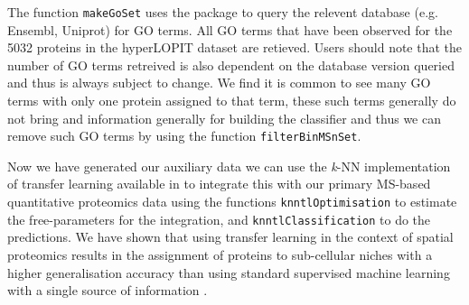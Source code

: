 The function \texttt{makeGoSet} uses the  package to
query the relevent database (e.g. Ensembl, Uniprot) for GO terms. All
GO terms that have been observed for the 5032 proteins in the
hyperLOPIT dataset are retieved. Users should note that the number of
GO terms retreived is also dependent on the database version queried
and thus is always subject to change. We find it is common to see many
GO terms with only one protein assigned to that term, these such terms
generally do not bring and information generally for building the
classifier and thus we can remove such GO terms by using the function
\texttt{filterBinMSnSet}.

\begin{knitrout}
\color{fgcolor}\begin{kframe}
\begin{alltt}
 \hlkwb{<-} 
\end{alltt}
\end{kframe}
\end{knitrout}

Now we have generated our auxiliary data we can use the \textit{k}-NN
implementation of transfer learning available in  to
integrate this with our primary MS-based quantitative proteomics data
using the functions \texttt{knntlOptimisation} to estimate the
free-parameters for the integration, and \texttt{knntlClassification}
to do the predictions. We have shown that using transfer learning in
the context of spatial proteomics results in the assignment of
proteins to sub-cellular niches with a higher generalisation accuracy
than using standard supervised machine learning with a single source
of information \cite{Breckels:2016}.

